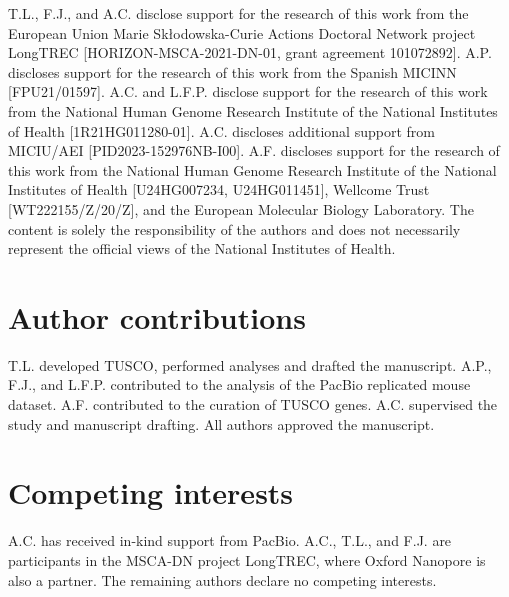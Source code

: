 \documentclass[pdflatex,sn-nature]{sn-jnl}%
\begin{document}
T.L., F.J., and A.C. disclose support for the research of this work from the European Union Marie Sk\l{}odowska-Curie Actions Doctoral Network project LongTREC [HORIZON-MSCA-2021-DN-01, grant agreement 101072892]. A.P. discloses support for the research of this work from the Spanish MICINN [FPU21/01597]. A.C. and L.F.P. disclose support for the research of this work from the National Human Genome Research Institute of the National Institutes of Health [1R21HG011280-01]. A.C. discloses additional support from MICIU/AEI [PID2023-152976NB-I00]. A.F. discloses support for the research of this work from the National Human Genome Research Institute of the National Institutes of Health [U24HG007234, U24HG011451], Wellcome Trust [WT222155/Z/20/Z], and the European Molecular Biology Laboratory. The content is solely the responsibility of the authors and does not necessarily represent the official views of the National Institutes of Health.

\section{Author contributions}

T.L. developed TUSCO, performed analyses and drafted the manuscript. A.P., F.J., and L.F.P. contributed to the analysis of the PacBio replicated mouse dataset. A.F. contributed to the curation of TUSCO genes. A.C. supervised the study and manuscript drafting. All authors approved the manuscript.

\section{Competing interests}

A.C. has received in-kind support from PacBio. A.C., T.L., and F.J. are participants in the MSCA-DN project LongTREC, where Oxford Nanopore is also a partner. The remaining authors declare no competing interests.




\clearpage
\processdelayedfloats
\end{document}
